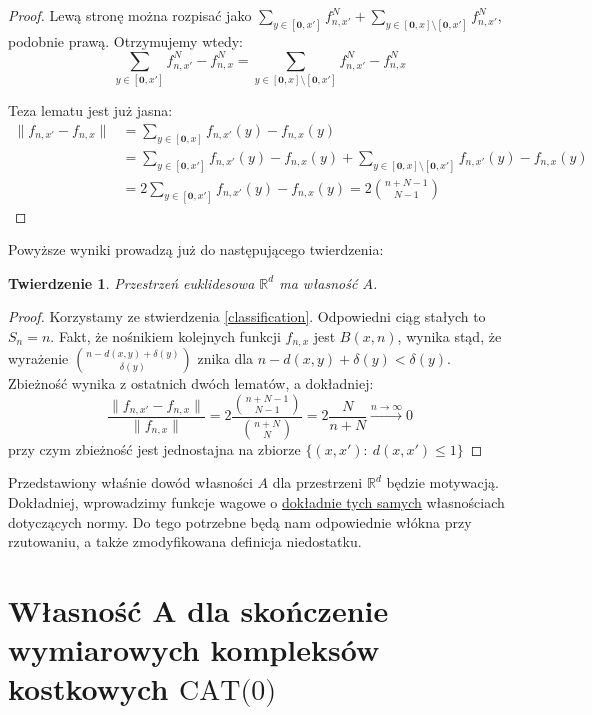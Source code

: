 \documentclass[licencjacka]{pracamgr}
\theoremstyle{definition}
\theoremstyle{definition}
\theoremstyle{definition}
\theoremstyle{definition}
\theoremstyle{definition}
\theoremstyle{plain}
\theoremstyle{plain}
\newtheorem{theorem}{Twierdzenie}[section]
\begin{document}
\begin{proof}
	Lewą stronę można rozpisać jako $  \sum_{y \in [\textbf{0},x']} f_{n,x'}^N + 
	 \sum_{y \in [\textbf{0},x] \setminus [\textbf{0}, x']} f_{n,x'}^N  $, podobnie prawą. 
	Otrzymujemy wtedy:
	$$  \sum\limits_{y \in [\textbf{0},x']} f_{n,x'}^N - f_{n,x}^N =
	   \sum\limits_{y \in [\textbf{0},x]\setminus [\textbf{0},x']} f_{n,x'}^N - f_{n,x}^N $$

	Teza lematu jest już jasna:
 	\begin{align*} 
		\|f_{n,x'} - f_{n,x} \| & =\sum\limits_{y\in [\textbf{0},x]} f_{n,x'}(y) - f_{n,x}(y) \\
		&= \sum\limits_{y\in [\textbf{0},x']} f_{n,x'}(y) - f_{n,x}(y)  + 
		\sum\limits_{y\in [\textbf{0},x]\setminus [\textbf{0},x']} f_{n,x'}(y) - f_{n,x}(y)\\ 
		& = 2\sum\limits_{y\in [\textbf{0},x']} f_{n,x'}(y) - f_{n,x}(y) = 2{n + N-1 
		\choose N-1}
	\end{align*}
\end{proof}

Powyższe wyniki prowadzą już do następującego twierdzenia:

\begin{theorem}
	Przestrzeń euklidesowa $ \mathbb{R}^d $ ma własność $ A $.
\end{theorem}
\begin{proof}
	Korzystamy ze stwierdzenia \ref{classification}. Odpowiedni ciąg stałych to $ S_n = n $. Fakt, 
	że nośnikiem kolejnych funkcji $ f_{n,x} $ jest $ B(x,n) $, wynika stąd, że 
	wyrażenie $ {n - d(x,y) + \delta(y) \choose \delta(y)} $ znika dla $ n - d(x,y) + \delta(y)
	< \delta(y) $. Zbieżność wynika z ostatnich dwóch lematów, a dokładniej:
	$$ \frac{\|f_{n,x'} - f_{n,x} \|}{ \|f_{n,x} \|} = 2\frac{{n + N - 1 \choose {N - 1}}}
	{{n + N \choose N}} = 2 \frac{N}{n + N} \xrightarrow{n \rightarrow \infty} 0 $$
	przy czym zbieżność jest jednostajna na zbiorze $ \{(x,x'): ~ d(x,x') \leq 1\} $
\end{proof}

Przedstawiony właśnie dowód własności $ A $ dla przestrzeni $ \mathbb{R}^d $ będzie 
motywacją. Dokładniej, wprowadzimy funkcje wagowe o \underline{dokładnie tych samych} 
własnościach dotyczących normy. Do tego potrzebne będą nam odpowiednie 
włókna przy rzutowaniu, a także zmodyfikowana definicja niedostatku.

\section{Własność A dla skończenie wymiarowych kompleksów kostkowych $ \text{CAT(0)} $}
\end{document}

